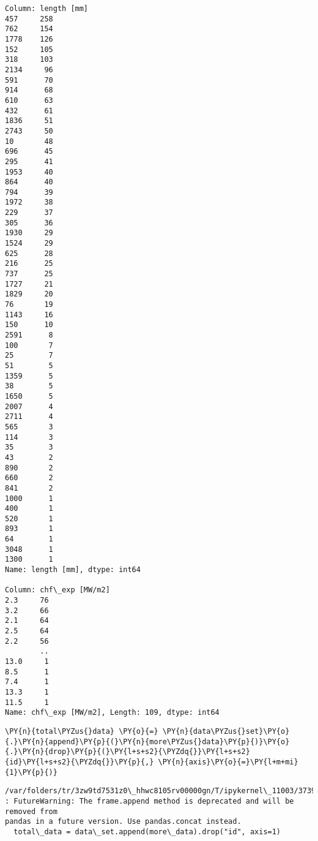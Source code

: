 \begin{Verbatim}[commandchars=\\\{\}]
Column: length [mm]
457     258
762     154
1778    126
152     105
318     103
2134     96
591      70
914      68
610      63
432      61
1836     51
2743     50
10       48
696      45
295      41
1953     40
864      40
794      39
1972     38
229      37
305      36
1930     29
1524     29
625      28
216      25
737      25
1727     21
1829     20
76       19
1143     16
150      10
2591      8
100       7
25        7
51        5
1359      5
38        5
1650      5
2007      4
2711      4
565       3
114       3
35        3
43        2
890       2
660       2
841       2
1000      1
400       1
520       1
893       1
64        1
3048      1
1300      1
Name: length [mm], dtype: int64

Column: chf\_exp [MW/m2]
2.3     76
3.2     66
2.1     64
2.5     64
2.2     56
        ..
13.0     1
8.5      1
7.4      1
13.3     1
11.5     1
Name: chf\_exp [MW/m2], Length: 109, dtype: int64

    \end{Verbatim}

    \begin{tcolorbox}[breakable, size=fbox, boxrule=1pt, pad at break*=1mm,colback=cellbackground, colframe=cellborder]
\begin{Verbatim}[commandchars=\\\{\}]
\PY{n}{total\PYZus{}data} \PY{o}{=} \PY{n}{data\PYZus{}set}\PY{o}{.}\PY{n}{append}\PY{p}{(}\PY{n}{more\PYZus{}data}\PY{p}{)}\PY{o}{.}\PY{n}{drop}\PY{p}{(}\PY{l+s+s2}{\PYZdq{}}\PY{l+s+s2}{id}\PY{l+s+s2}{\PYZdq{}}\PY{p}{,} \PY{n}{axis}\PY{o}{=}\PY{l+m+mi}{1}\PY{p}{)}
\end{Verbatim}
\end{tcolorbox}

    \begin{Verbatim}[commandchars=\\\{\}]
/var/folders/tr/3zw9td7531z0\_hhwc8105rv00000gn/T/ipykernel\_11003/3739133671.py:1
: FutureWarning: The frame.append method is deprecated and will be removed from
pandas in a future version. Use pandas.concat instead.
  total\_data = data\_set.append(more\_data).drop("id", axis=1)
    \end{Verbatim}

